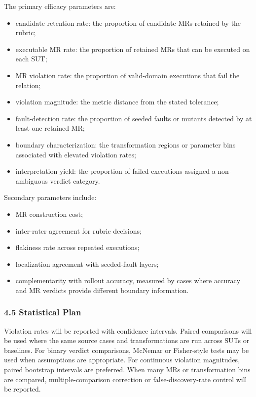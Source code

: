 The primary efficacy parameters are:

\begin{itemize}
\tightlist
\item
  candidate retention rate: the proportion of candidate MRs retained by
  the rubric;
\item
  executable MR rate: the proportion of retained MRs that can be
  executed on each SUT;
\item
  MR violation rate: the proportion of valid-domain executions that fail
  the relation;
\item
  violation magnitude: the metric distance from the stated tolerance;
\item
  fault-detection rate: the proportion of seeded faults or mutants
  detected by at least one retained MR;
\item
  boundary characterization: the transformation regions or parameter
  bins associated with elevated violation rates;
\item
  interpretation yield: the proportion of failed executions assigned a
  non-ambiguous verdict category.
\end{itemize}

Secondary parameters include:

\begin{itemize}
\tightlist
\item
  MR construction cost;
\item
  inter-rater agreement for rubric decisions;
\item
  flakiness rate across repeated executions;
\item
  localization agreement with seeded-fault layers;
\item
  complementarity with rollout accuracy, measured by cases where
  accuracy and MR verdicts provide different boundary information.
\end{itemize}

\subsubsection{4.5 Statistical Plan}\label{statistical-plan}

Violation rates will be reported with confidence intervals. Paired
comparisons will be used where the same source cases and transformations
are run across SUTs or baselines. For binary verdict comparisons,
McNemar or Fisher-style tests may be used when assumptions are
appropriate. For continuous violation magnitudes, paired bootstrap
intervals are preferred. When many MRs or transformation bins are
compared, multiple-comparison correction or false-discovery-rate control
will be reported.

